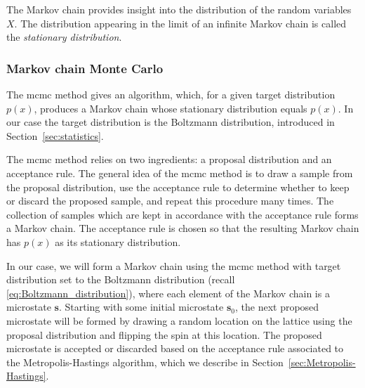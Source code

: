 \documentclass[english,notitlepage,reprint]{revtex4-2}  %
\renewcommand{\vec}[1]{\mathbf{#1}}
\begin{document}
The Markov chain provides insight into the distribution of the random variables \(X\). 
The distribution appearing in the limit of an infinite Markov chain is called the \emph{stationary distribution}. 

\subsubsection{Markov chain Monte Carlo}
The \gls{mcmc} method gives an algorithm, which, for a given target distribution \(p(x)\), produces a Markov chain whose stationary distribution equals \(p(x)\).
In our case the target distribution is the Boltzmann distribution, introduced in Section~\ref{sec:statistics}. 


The \gls{mcmc} method relies on two ingredients: a proposal distribution and an acceptance rule. 
The general idea of the \gls{mcmc} method is to draw a sample from the proposal distribution, use the acceptance rule to determine whether to keep or discard the proposed sample, and repeat this procedure many times. 
The collection of samples which are kept in accordance with the acceptance rule forms a Markov chain. 
The acceptance rule is chosen so that the resulting Markov chain has \(p(x)\) as its stationary distribution.

In our case, we will form a Markov chain using the \gls{mcmc} method with target distribution set to the Boltzmann distribution (recall \eqref{eq:Boltzmann_distribution}), where each element of the Markov chain is a microstate \(\vec{s}\). 
Starting with some initial microstate \(\vec{s}_0\), the next proposed microstate will be formed by drawing a random location on the lattice using the proposal distribution and flipping the spin at this location. 
The proposed microstate is accepted or discarded based on the acceptance rule associated to the Metropolis-Hastings algorithm, which we describe in Section~\ref{sec:Metropolis-Hastings}.
\end{document}
